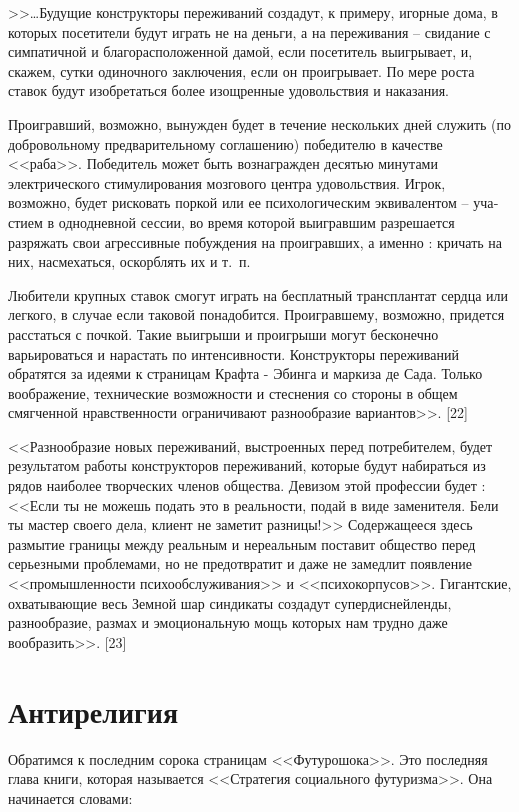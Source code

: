 \documentclass{book}
\begin{document}
>>\ldots Будущие конструкторы переживаний создадут, к приме­ру, игорные дома, в которых посетители будут играть не на деньги, а на переживания -- свидание с симпатичной и благо­расположенной дамой, если посетитель выигрывает, и, скажем, сутки одиночного заключения, если он проигрывает. По мере роста ставок будут изобретаться более изощренные удовольст­вия и наказания.

Проигравший, возможно, вынужден будет в течение несколь­ких дней служить (по добровольному предварительному согла­шению) победителю в качестве <<раба>>. Победитель может быть вознагражден десятью минутами электрического стимулирова­ния мозгового центра удовольствия. Игрок, возможно, будет рисковать поркой или ее психологическим эквивалентом -- уча­стием в однодневной сессии, во время которой выигравшим разрешается разряжать свои агрессивные побуждения на проиг­равших, а именно : кричать на них, насмехаться, оскорблять их и т.~п.

Любители крупных ставок смогут играть на бесплатный трансплантат сердца или легкого, в случае если таковой пона­добится. Проигравшему, возможно, придется расстаться с поч­кой. Такие выигрыши и проигрыши могут бесконечно варьироваться и нарастать по интенсивности. Конструкторы пережи­ваний обратятся за идеями к страницам Крафта - Эбинга и мар­киза де Сада. Только воображение, технические возможности и стеснения со стороны в общем смягченной нравственности ограничивают разнообразие вариантов>>. [22]

<<Разнообразие новых переживаний, выстроенных перед по­требителем, будет результатом работы конструкторов пережи­ваний, которые будут набираться из рядов наиболее творче­ских членов общества. Девизом этой профессии будет : <<Если ты не можешь подать это в реальности, подай в виде заменителя. Бели ты мастер своего дела, клиент не заметит разницы!>> Содер­жащееся здесь размытие границы между реальным и нереаль­ным поставит общество перед серьезными проблемами, но не предотвратит и даже не замедлит появление <<промышленности психообслуживания>> и <<психокорпусов>>. Гигантские, охваты­вающие весь Земной шар синдикаты создадут супердиснейленды, разнообразие, размах и эмоциональную мощь которых нам трудно даже вообразить>>. [23]


\section{Антирелигия}

Обратимся к последним сорока страницам <<Футурошока>>. Это последняя глава книги, которая называется <<Стратегия со­циального футуризма>>. Она начинается словами:
\end{document}
